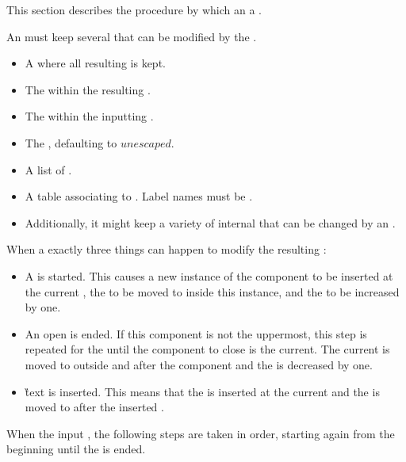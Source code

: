 This section describes the procedure by which an   a .

An  must keep several  that can be modified by the .

\begin{itemize}
\item A   where all resulting  is kept.
\item The  within the resulting .
\item The  within the inputting .
\item The , defaulting to \inline$unescaped$.
\item A list of .
\item A table associating  to . Label names must be .
\item Additionally, it might keep a variety of internal  that can be changed by an .
\end{itemize}

When  a  exactly three things can happen to modify the resulting :

\begin{itemize}
\item A  is started. This causes a new instance of the component to be inserted at the current , the  to be moved to inside this instance, and the  to be increased by one.
\item An open  is ended. If this component is not the uppermost, this step is repeated for the  until the component to close is the current. The current  is moved to outside and after the component and the  is decreased by one.
\item \G{text} is inserted. This means that the  is inserted at the current  and the  is moved to after the inserted .
\end{itemize}

When  the input , the following steps are taken in order, starting again from the beginning until the   is ended.

